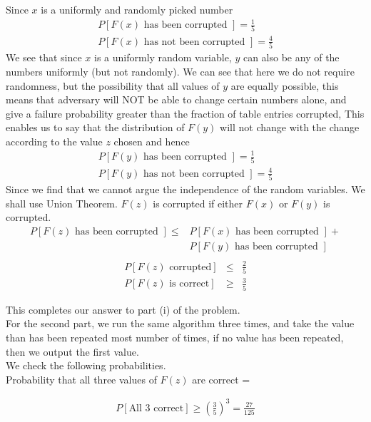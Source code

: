 \documentclass{assignment}
\begin{document}
\begin{problemlist}
\begin{problem}
\begin{answer}
Since $x$ is a uniformly and randomly picked number
\begin {eqnarray}
 P[F(x)\textrm{ has been corrupted }] = \frac{1}{5} \\
 P[F(x)\textrm{ has not been corrupted }] = \frac{4}{5}
\end {eqnarray}
We see that since $x$ is a uniformly random variable, $y$ can also be any of the numbers uniformly (but not randomly). We can see that here we do not require randomness, but the possibility that all values of $y$ are equally possible, this means that adversary will NOT be able to change certain numbers alone, and give a failure probability greater than the fraction of table entries corrupted, This enables us to say that the distribution of $F(y)$ will not change with the change according to the value  $z$ chosen and hence
\begin {eqnarray}
 P[F(y)\textrm{ has been corrupted }] = \frac{1}{5} \\
 P[F(y)\textrm{ has not been corrupted }] = \frac{4}{5}
\end {eqnarray}
Since we find that we cannot argue the independence of the random variables. We shall use Union Theorem. $F(z)$ is corrupted if either $F(x)$ or $F(y)$ is corrupted.
\begin {eqnarray}
 P[F(z)\textrm{ has been corrupted }] \leq & P[F(x)\textrm{ has been corrupted }] + \\
 & P[F(y)\textrm{ has been corrupted }] \nonumber \\
\end {eqnarray}
\begin{eqnarray}
P[F(z) \textrm{ corrupted}]  & \leq & \frac{2}{5} \\
P[F(z) \textrm{ is correct}] & \geq & \frac{3}{5}
\end{eqnarray}


This completes our answer to part (i) of the problem. \\

For the second part, we run the same algorithm three times, and take the value than has been repeated most number of times, if no value has been repeated, then we output the first value. \\  

We check the following probabilities. \\

Probability that all three values of $F(z)$ are correct =

\begin{eqnarray}
P[\textrm{All 3 correct} ]  \geq \left( \frac{3}{5} \right) ^3 = \frac{27}{125}  
\end{eqnarray}


\end{answer}
\end{problem}
\end{problemlist}
\end{document}
